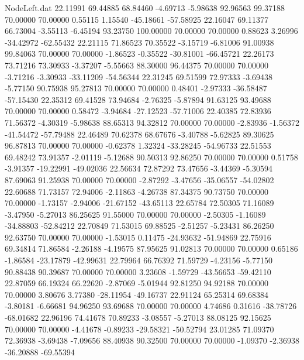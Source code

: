 \begin{filecontents}{NodeLeft.dat}
  22.11991   69.44885   68.84460    -4.69713   -5.98638   92.96563   99.37188   70.00000   70.00000    0.55115    1.15540  -45.18661  -57.58925
  22.16047   69.11377   66.73004    -3.55113   -6.45194   93.23750  100.00000   70.00000   70.00000    0.88623    3.26996  -34.42972  -62.55432
  22.21115   71.86523   70.35522    -3.15719   -6.81006   91.00938   99.84063   70.00000   70.00000   -1.86523   -0.35522  -30.81001  -66.45721
  22.26173   73.71216   73.30933    -3.37207   -5.55663   88.30000   96.44375   70.00000   70.00000   -3.71216   -3.30933  -33.11209  -54.56344
  22.31245   69.51599   72.97333    -3.69438   -5.77150   90.75938   95.27813   70.00000   70.00000    0.48401   -2.97333  -36.58487  -57.15430
  22.35312   69.41528   73.94684    -2.76325   -5.87894   91.63125   93.49688   70.00000   70.00000    0.58472   -3.94684  -27.12523  -57.71006
  22.40385   72.83936   71.56372    -4.30319   -5.98638   88.65313   94.32812   70.00000   70.00000   -2.83936   -1.56372  -41.54472  -57.79488
  22.46489   70.62378   68.67676    -3.40788   -5.62825   89.30625   96.87813   70.00000   70.00000   -0.62378    1.32324  -33.28245  -54.96733
  22.51553   69.48242   73.91357    -2.01119   -5.12688   90.50313   92.86250   70.00000   70.00000    0.51758   -3.91357  -19.22991  -49.02036
  22.56634   72.87292   73.47656    -3.44369   -5.30594   87.69063   91.25938   70.00000   70.00000   -2.87292   -3.47656  -35.06557  -54.02802
  22.60688   71.73157   72.94006    -2.11863   -4.26738   87.34375   90.73750   70.00000   70.00000   -1.73157   -2.94006  -21.67152  -43.65113
  22.65784   72.50305   71.16089    -3.47950   -5.27013   86.25625   91.55000   70.00000   70.00000   -2.50305   -1.16089  -34.88803  -52.84212
  22.70849   71.53015   69.88525    -2.51257   -5.23431   86.26250   92.63750   70.00000   70.00000   -1.53015    0.11475  -24.93632  -51.94869
  22.75916   69.34814   71.86584    -2.26188   -4.19575   87.95625   91.02813   70.00000   70.00000    0.65186   -1.86584  -23.17879  -42.99631
  22.79964   66.76392   71.59729    -4.23156   -5.77150   90.88438   90.39687   70.00000   70.00000    3.23608   -1.59729  -43.56653  -59.42110
  22.87059   66.19324   66.22620    -2.87069   -5.01944   92.81250   94.92188   70.00000   70.00000    3.80676    3.77380  -28.11954  -49.16737
  22.91124   65.25314   69.68384    -3.80181   -6.66681   94.96250   93.69688   70.00000   70.00000    4.74686    0.31616  -38.78726  -68.01682
  22.96196   74.41678   70.89233    -3.08557   -5.27013   88.08125   92.15625   70.00000   70.00000   -4.41678   -0.89233  -29.58321  -50.52794
  23.01285   71.09370   72.36938    -3.69438   -7.09656   88.40938   90.32500   70.00000   70.00000   -1.09370   -2.36938  -36.20888  -69.55394

\end{filecontents}
